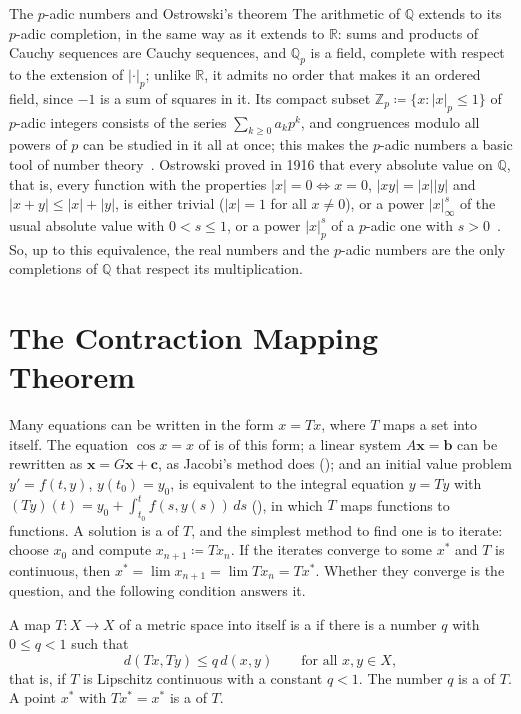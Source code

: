 \begin{note}{The \texorpdfstring{$p$}{p}-adic numbers and Ostrowski's theorem}
The arithmetic of $\mathbb Q$ extends to its $p$-adic completion, in the same way as it extends to $\mathbb R$: sums and products of Cauchy sequences are Cauchy sequences, and $\mathbb Q_p$ is a field, complete with respect to the extension of $|\cdot|_p$; unlike $\mathbb R$, it admits no order that makes it an ordered field, since $-1$ is a sum of squares in it. Its compact subset $\mathbb Z_p\coloneqq\{x: |x|_p\le1\}$ of $p$-adic integers consists of the series $\sum_{k\ge0}a_kp^k$, and congruences modulo all powers of $p$ can be studied in it all at once; this makes the $p$-adic numbers a basic tool of number theory~\cite{gouvea1997}. Ostrowski proved in 1916 that every absolute value on $\mathbb Q$, that is, every function with the properties $|x|=0\Leftrightarrow x=0$, $|xy|=|x||y|$ and $|x+y|\le|x|+|y|$, is either trivial ($|x|=1$ for all $x\ne0$), or a power $|x|_\infty^s$ of the usual absolute value with $0<s\le1$, or a power $|x|_p^s$ of a $p$-adic one with $s>0$~\cite{ostrowski1916}. So, up to this equivalence, the real numbers and the $p$-adic numbers are the only completions of $\mathbb Q$ that respect its multiplication.
\end{note}

\section{The Contraction Mapping Theorem}
\label{sec:contraction}

Many equations can be written in the form $x=Tx$, where $T$ maps a set into itself. The equation $\cos x=x$ of  is of this form; a linear system $A\mathbf x=\mathbf b$ can be rewritten as $\mathbf x=G\mathbf x+\mathbf c$, as Jacobi's method does (); and an initial value problem $y'=f(t,y)$, $y(t_0)=y_0$, is equivalent to the integral equation $y=Ty$ with $(Ty)(t)=y_0+\int_{t_0}^tf(s,y(s))\,ds$ (), in which $T$ maps functions to functions. A solution is a  of $T$, and the simplest method to find one is to iterate: choose $x_0$ and compute $x_{n+1}\coloneqq Tx_n$. If the iterates converge to some $x^*$ and $T$ is continuous, then $x^*=\lim x_{n+1}=\lim Tx_n=Tx^*$. Whether they converge is the question, and the following condition answers it.

\begin{definition}[Contraction]
\label{def:contraction}
A map $T\colon X\to X$ of a metric space into itself is a  if there is a number $q$ with $0\le q<1$ such that
\[
d(Tx,Ty)\le q\,d(x,y)\qquad\text{for all }x,y\in X ,
\]
that is, if $T$ is Lipschitz continuous with a constant $q<1$. The number $q$ is a  of $T$. A point $x^*$ with $Tx^*=x^*$ is a  of $T$.
\end{definition}

